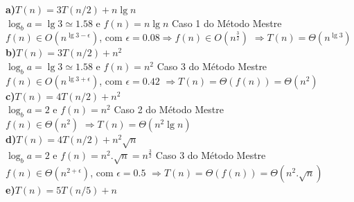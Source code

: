 \documentclass[a4paper]{exam}
\begin{document}
\begin{questions}
  \begin{solution}
    \textbf{a)$T(n) = 3T(n/2) + n\lg n$}\\
      $\log_b a = \lg 3 \simeq 1.58$ e $f(n) = n\lg n$ \Rightarrow  Caso 1 do Método Mestre\\
      $f(n) \in O(n^{\lg 3 - \epsilon})$, com $\epsilon = 0.08 \Rightarrow f(n) \in O(n^{\frac{3}{2}})$
      $\Rightarrow T(n) = \Theta(n^{\lg 3})$\\
    \textbf{b)$T(n) = 3T(n/2) + n^2$}\\
      $\log_b a = \lg 3 \simeq 1.58$ e $f(n) = n^2$ \Rightarrow  Caso 3 do Método Mestre\\
      $f(n) \in O(n^{\lg 3 + \epsilon})$, com $\epsilon = 0.42$
      $\Rightarrow T(n) = \Theta(f(n)) = \Theta(n^2)$\\
    \textbf{c)$T(n) = 4T(n/2) + n^2$}\\
      $\log_b a = 2 $ e $f(n) = n^2$ \Rightarrow  Caso 2 do Método Mestre\\
      $f(n) \in \Theta(n^2)$
      $\Rightarrow T(n) = \Theta(n^2 \lg n)$\\
    \textbf{d)$T(n) = 4T(n/2) + n^2\sqrt{n}$}\\
      $\log_b a = 2 $ e $f(n) = n^2.\sqrt{n} = n^{\frac{3}{2}}$ \Rightarrow  Caso 3 do Método Mestre\\
      $f(n) \in \Theta(n^{2 + \epsilon})$, com $\epsilon = 0.5$
      $\Rightarrow T(n) = \Theta(f(n)) = \Theta(n^2.\sqrt{n})$\\
    \textbf{e)$T(n) = 5T(n/5) + n$}\\

\end{solution}
\end{questions}
\end{document}
